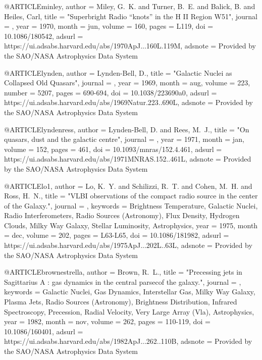 {@ARTICLE{minley,
       author = {{Miley}, G.~K. and {Turner}, B.~E. and {Balick}, B. and {Heiles}, Carl},
        title = "{Superbright Radio ``knots'' in the H II Region W51}",
      journal = {\apjl},
         year = 1970,
        month = jun,
       volume = {160},
        pages = {L119},
          doi = {10.1086/180542},
       adsurl = {https://ui.adsabs.harvard.edu/abs/1970ApJ...160L.119M},
      adsnote = {Provided by the SAO/NASA Astrophysics Data System}
}

@ARTICLE{lynden,
       author = {{Lynden-Bell}, D.},
        title = "{Galactic Nuclei as Collapsed Old Quasars}",
      journal = {\nat},
         year = 1969,
        month = aug,
       volume = {223},
       number = {5207},
        pages = {690-694},
          doi = {10.1038/223690a0},
       adsurl = {https://ui.adsabs.harvard.edu/abs/1969Natur.223..690L},
      adsnote = {Provided by the SAO/NASA Astrophysics Data System}
}

@ARTICLE{lyndenress,
       author = {{Lynden-Bell}, D. and {Rees}, M.~J.},
        title = "{On quasars, dust and the galactic centre}",
      journal = {\mnras},
         year = 1971,
        month = jan,
       volume = {152},
        pages = {461},
          doi = {10.1093/mnras/152.4.461},
       adsurl = {https://ui.adsabs.harvard.edu/abs/1971MNRAS.152..461L},
      adsnote = {Provided by the SAO/NASA Astrophysics Data System}
}

@ARTICLE{lo1,
       author = {{Lo}, K.~Y. and {Schilizzi}, R.~T. and {Cohen}, M.~H. and {Ross}, H.~N.},
        title = "{VLBI observations of the compact radio source in the center of the Galaxy.}",
      journal = {\apjl},
     keywords = {Brightness Temperature, Galactic Nuclei, Radio Interferometers, Radio Sources (Astronomy), Flux Density, Hydrogen Clouds, Milky Way Galaxy, Stellar Luminosity, Astrophysics},
         year = 1975,
        month = dec,
       volume = {202},
        pages = {L63-L65},
          doi = {10.1086/181982},
       adsurl = {https://ui.adsabs.harvard.edu/abs/1975ApJ...202L..63L},
      adsnote = {Provided by the SAO/NASA Astrophysics Data System}
}

@ARTICLE{brownestrella,
       author = {{Brown}, R.~L.},
        title = "{Precessing jets in Sagittarius A : gas dynamics in the central parsecof the galaxy.}",
      journal = {\apj},
     keywords = {Galactic Nuclei, Gas Dynamics, Interstellar Gas, Milky Way Galaxy, Plasma Jets, Radio Sources (Astronomy), Brightness Distribution, Infrared Spectroscopy, Precession, Radial Velocity, Very Large Array (Vla), Astrophysics},
         year = 1982,
        month = nov,
       volume = {262},
        pages = {110-119},
          doi = {10.1086/160401},
       adsurl = {https://ui.adsabs.harvard.edu/abs/1982ApJ...262..110B},
      adsnote = {Provided by the SAO/NASA Astrophysics Data System}
}

}
